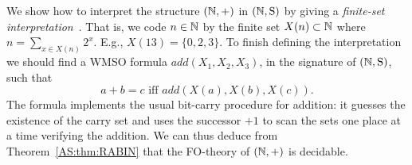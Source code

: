 \begin{example}
We show how to interpret the structure $(\mathbb{N},+)$ in $\mbox{$(\mathbb{N},\mathrm{S})$}$ by giving a \emph{finite-set interpretation}~\cite{Robi58,Buch60,Elgo61}. That is, 
we code $n \in \mathbb{N}$ by the finite set $X(n) \subset \mathbb{N}$ where $n = \sum_{x \in X(n)} 2^x$. E.g., $X(13) = \{0,2,3\}$. To finish defining the interpretation we should find a WMSO formula $add(X_1,X_2,X_3)$, in the signature of $\mbox{$(\mathbb{N},\mathrm{S})$}$, such that 
\[
a+b = c \mbox{ iff } add(X(a),X(b),X(c)).
\]
The formula implements the usual bit-carry procedure for addition:
it guesses the existence of the carry set and uses the successor $+1$ to scan the
sets one place at a time verifying the addition. We can thus deduce from Theorem~\ref{AS:thm:RABIN} that the FO-theory of $(\mathbb{N},+)$ is decidable.
\end{example}


